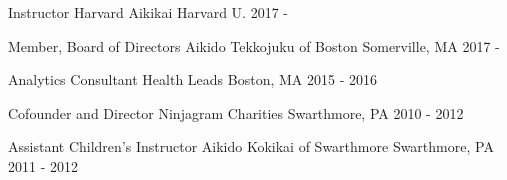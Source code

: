 


\begin{cventries}

  \cventry
    {Instructor} %
    {Harvard Aikikai} %
    {Harvard U.} %
    {2017 - } %
    {}

\cventry
    {Member, Board of Directors} %
    {Aikido Tekkojuku of Boston} %
    {Somerville, MA} %
    {2017 - } %
    {}

\cventry
    {Analytics Consultant} %
    {Health Leads} %
    {Boston, MA} %
    {2015 - 2016} %
    {}

\cventry
    {Cofounder and Director} %
    {Ninjagram Charities} %
    {Swarthmore, PA} %
    {2010 - 2012} %
    {}

\cventry
    {Assistant Children's Instructor} %
    {Aikido Kokikai of Swarthmore} %
    {Swarthmore, PA} %
    {2011 - 2012} %
    {}
\end{cventries}